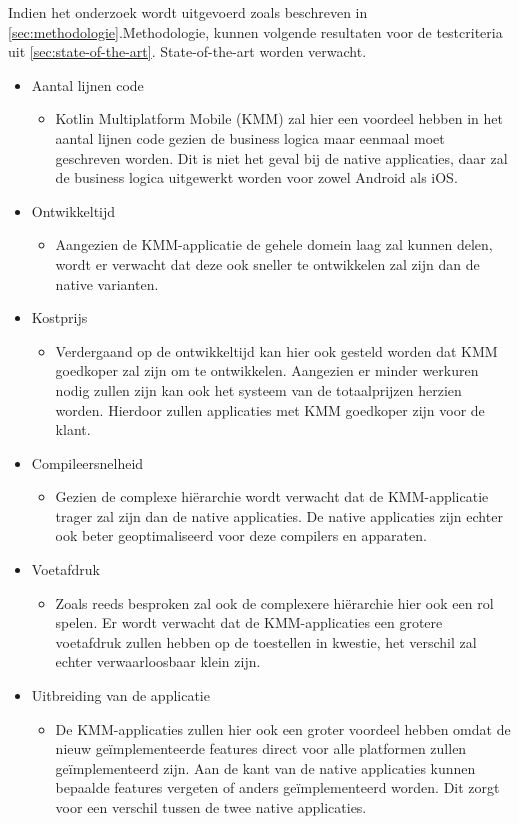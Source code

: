 Indien het onderzoek wordt uitgevoerd zoals beschreven in \ref{sec:methodologie}.Methodologie, kunnen volgende resultaten voor de testcriteria uit \ref{sec:state-of-the-art}. State-of-the-art worden verwacht.
\begin{itemize}
\item Aantal lijnen code
\begin{itemize}
\item Kotlin Multiplatform Mobile (KMM) zal hier een voordeel hebben in het aantal lijnen code gezien de business logica maar eenmaal moet geschreven worden. Dit is niet het geval bij de native applicaties, daar zal de business logica uitgewerkt worden voor zowel Android als iOS.
\end{itemize}
\item Ontwikkeltijd
\begin{itemize}
\item Aangezien de KMM-applicatie de gehele domein laag zal kunnen delen, wordt er verwacht dat deze ook sneller te ontwikkelen zal zijn dan de native varianten.
\end{itemize}
\item Kostprijs
\begin{itemize}
\item Verdergaand op de ontwikkeltijd kan hier ook gesteld worden dat KMM goedkoper zal zijn om te ontwikkelen. Aangezien er minder werkuren nodig zullen zijn kan ook het systeem van de totaalprijzen herzien worden. Hierdoor zullen applicaties met KMM goedkoper zijn voor de klant.
\end{itemize}
\item Compileersnelheid
\begin{itemize}
\item Gezien de complexe hiërarchie wordt verwacht dat de KMM-applicatie trager zal zijn dan de native applicaties. De native applicaties zijn echter ook beter geoptimaliseerd voor deze compilers en apparaten.
\end{itemize}
\item Voetafdruk
\begin{itemize}
\item Zoals reeds besproken zal ook de complexere hiërarchie hier ook een rol spelen. Er wordt verwacht dat de KMM-applicaties een grotere voetafdruk zullen hebben op de toestellen in kwestie, het verschil zal echter verwaarloosbaar klein zijn. 
\end{itemize}
\item Uitbreiding van de applicatie
\begin{itemize}
\item De KMM-applicaties zullen hier ook een groter voordeel hebben omdat de nieuw geïmplementeerde features direct voor alle platformen zullen geïmplementeerd zijn. Aan de kant van de native applicaties kunnen bepaalde features vergeten of anders geïmplementeerd worden. Dit zorgt voor een verschil tussen de twee native applicaties.
\\
\end{itemize}
\end{itemize}


